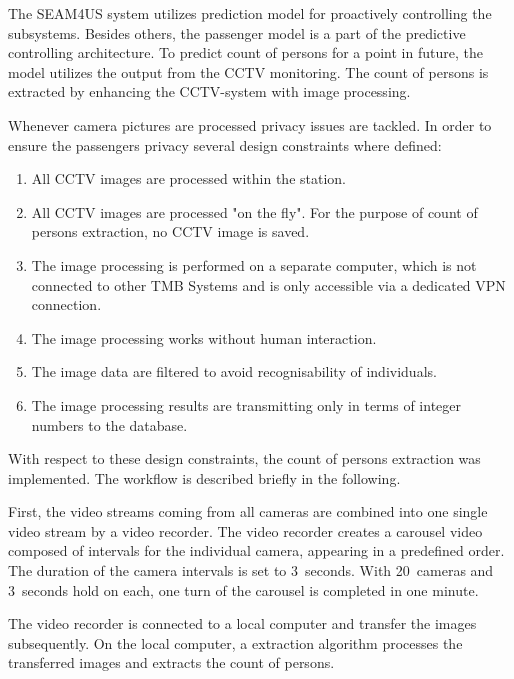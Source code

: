 The SEAM4US system utilizes prediction model for proactively controlling the subsystems. Besides others, the passenger model is a part of the predictive controlling architecture.
To predict count of persons for a point in future, the model utilizes the output from the CCTV monitoring. The count of persons is extracted by enhancing the CCTV-system with image processing.

Whenever camera pictures are processed privacy issues are tackled. In order to ensure the passengers privacy several design constraints where defined:

\begin{enumerate}\setlength{\itemsep}{-2pt}
  \item All CCTV images are processed within the station.
  \item All CCTV images are processed "on the fly". For the purpose of count of persons extraction, no CCTV image is saved.
  \item The image processing is performed on a separate computer, which is not connected to other TMB Systems and is only accessible via a dedicated VPN connection.
  \item The image processing works without human interaction.
  \item The image data are filtered to avoid recognisability of individuals.
  \item The image processing results are transmitting only in terms of integer numbers to the database.
\end{enumerate}

With respect to these design constraints, the count of persons extraction was implemented. The workflow is described briefly in the following.

First, the video streams coming from all cameras are combined into one single video stream by a video recorder. The video recorder creates a carousel video composed of intervals for the individual camera, appearing in a predefined order. The duration of the camera intervals is set to 3~seconds. With 20~cameras and 3~seconds hold on each, one turn of the carousel is completed in one minute.

The video recorder is connected to a local computer and transfer the images subsequently. On the local computer, a extraction algorithm processes the transferred images and extracts the count of persons.

